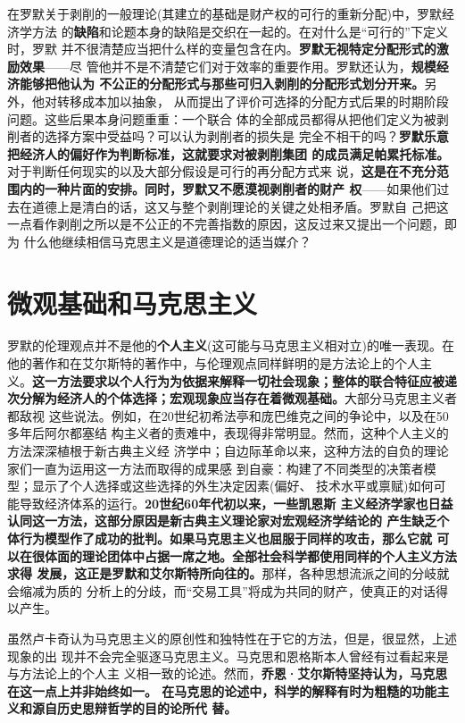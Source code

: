 在罗默关于剥削的一般理论(其建立的基础是财产权的可行的重新分配)中，罗默经济学方法
的\textbf{缺陷}和论题本身的缺陷是交织在一起的。在对什么是“可行的”下定义时，罗默
并不很清楚应当把什么样的变量包含在内。\textbf{罗默无视特定分配形式的激励效果}——尽
管他并不是不清楚它们对于效率的重要作用。罗默还认为，\textbf{规模经济能够把他认为
  不公正的分配形式与那些可归入剥削的分配形式划分开来。}另外，他对转移成本加以抽象，
从而提出了评价可选择的分配方式后果的时期阶段问题。这些后果本身问题重重：一个联合
体的全部成员都得从把他们定义为被剥削者的选择方案中受益吗？可以认为剥削者的损失是
完全不相干的吗？\textbf{罗默乐意把经济人的偏好作为判断标准，这就要求对被剥削集团
  的成员满足帕累托标准。}对于判断任何现实的以及大部分假设是可行的再分配方式来
说，\textbf{这是在不充分范围内的一种片面的安排。同时，罗默又不愿漠视剥削者的财产
  权}——如果他们过去在道德上是清白的话，这又与整个剥削理论的关键之处相矛盾。罗默自
己把这一点看作剥削之所以是不公正的不完善指数的原因，这反过来又提出一个问题，即为
什么他继续相信马克思主义是道德理论的适当媒介？

\section{微观基础和马克思主义}

罗默的伦理观点并不是他的\textbf{个人主义}(这可能与马克思主义相对立)的唯一表现。在
他的著作和在艾尔斯特的著作中，与伦理观点同样鲜明的是方法论上的个人主
义。\textbf{这一方法要求以个人行为为依据来解释一切社会现象；整体的联合特征应被递
  次分解为经济人的个体选择；宏观现象应当存在着微观基础。}大部分马克思主义者都敌视
这些说法。例如，在20世纪初希法亭和庞巴维克之间的争论中，以及在50多年后阿尔都塞结
构主义者的责难中，表现得非常明显。然而，这种个人主义的方法深深植根于新古典主义经
济学中；自边际革命以来，这种方法的自负的理论家们一直为运用这一方法而取得的成果感
到自豪：构建了不同类型的决策者模型；显示了个人选择或这些选择的外生决定因素(偏好、
技术水平或禀赋)如何可能导致经济体系的运行。\textbf{20世纪60年代初以来，一些凯恩斯
  主义经济学家也日益认同这一方法，这部分原因是新古典主义理论家对宏观经济学结论的
  产生缺乏个体行为模型作了成功的批判。如果马克思主义也屈服于同样的攻击，那么它就
  可以在很体面的理论团体中占据一席之地。全部社会科学都使用同样的个人主义方法求得
  发展，这正是罗默和艾尔斯特所向往的。}那样，各种思想流派之间的分岐就会缩减为质的
分析上的分歧，而“交易工具”将成为共同的财产，使真正的对话得以产生。

虽然卢卡奇认为马克思主义的原创性和独特性在于它的方法，但是，很显然，上述现象的出
现并不会完全驱逐马克思主义。马克思和恩格斯本人曾经有过看起来是与方法论上的个人主
义相一致的论述。然而，\textbf{乔恩·艾尔斯特坚持认为，马克思在这一点上并非始终如一。
  在马克思的论述中，科学的解释有时为粗糙的功能主义和源自历史思辩哲学的目的论所代
  替。}

